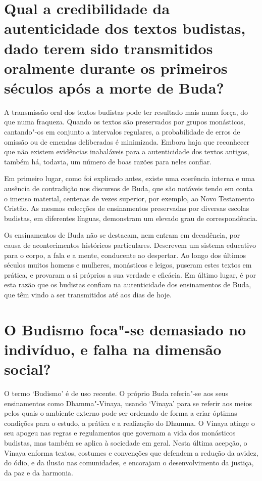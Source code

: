 \section{Qual a credibilidade da autenticidade dos textos budistas, dado terem
  sido transmitidos oralmente durante os primeiros séculos após a morte de
  Buda?}

A transmissão oral dos textos budistas pode ter resultado mais numa
força, do que numa fraqueza. Quando os textos são preservados por grupos
monásticos, cantando"-os em conjunto a intervalos regulares, a
probabilidade de erros de omissão ou de emendas deliberadas é
minimizada. Embora haja que reconhecer que não existem evidências
inabaláveis para a autenticidade dos textos antigos, também há, todavia,
um número de boas razões para neles confiar.

Em primeiro lugar, como foi explicado antes, existe uma coerência
interna e uma ausência de contradição nos discursos de Buda, que são
notáveis tendo em conta o imenso material, centenas de vezes superior,
por exemplo, ao Novo Testamento Cristão. As mesmas colecções de
ensinamentos preservadas por diversas escolas budistas, em diferentes
línguas, demonstram um elevado grau de correspondência.

Os ensinamentos de Buda não se destacam, nem entram em decadência, por
causa de acontecimentos históricos particulares. Descrevem um sistema
educativo para o corpo, a fala e a mente, conducente ao despertar. Ao
longo dos últimos séculos muitos homens e mulheres, monásticos e leigos,
puseram estes textos em prática, e provaram a si próprios a sua verdade
e eficácia. Em último lugar, é por esta razão que os budistas confiam na
autenticidade dos ensinamentos de Buda, que têm vindo a ser transmitidos
até aos dias de hoje.

\section{O Budismo foca"-se demasiado no indivíduo, e falha na dimensão social?}

O termo `Budismo' é de uso recente. O próprio Buda referia"-se aos seus
ensinamentos como Dhamma"-Vinaya, usando `Vinaya' para se referir aos
meios pelos quais o ambiente externo pode ser ordenado de forma a criar
óptimas condições para o estudo, a prática e a realização do Dhamma. O
Vinaya atinge o seu apogeu nas regras e regulamentos que governam a vida
dos monásticos budistas, mas também se aplica à sociedade em geral.
Nesta última acepção, o Vinaya enforma textos, costumes e convenções que
defendem a redução da avidez, do ódio, e da ilusão nas comunidades, e
encorajam o desenvolvimento da justiça, da paz e da harmonia.

